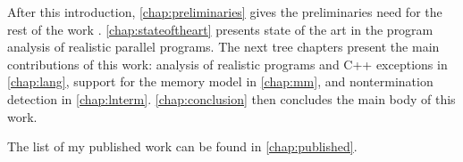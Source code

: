 After this introduction, \autoref{chap:preliminaries} gives the preliminaries
need for the rest of the work .
\autoref{chap:stateoftheart} presents state of the art in the program analysis
of realistic parallel programs.
The next tree chapters present the main contributions of this work: analysis of
realistic programs and C++ exceptions in \autoref{chap:lang}, support for the
\xtso memory model in \autoref{chap:mm}, and nontermination detection in
\autoref{chap:lnterm}.
\autoref{chap:conclusion} then concludes the main body of this work.

The list of my published work can be found in \autoref{chap:published}.
